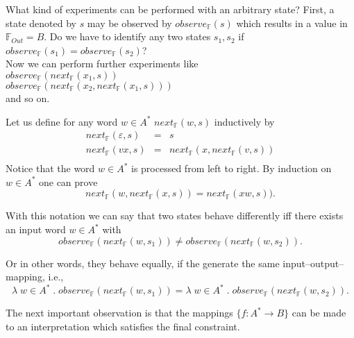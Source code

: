 \documentclass[landscape, autoslides, light]{mmiss}
\begin{document}
\begin{Package}[Label={FSDPT}, Title={Formal Specification of Data and Process Types}, ShortTitle={FSDPT}, Authors={Horst Reichel}, Date={February 2003}, LevelOfDetail=Lecture, Language=en-GB]
\begin{Section}[Title={Final Coalgebras as Process Types}, Label={section4}]
\begin{Section}[Title={Examples of Process Types}, Label={section4_2}]
\begin{Paragraph}[Title={final Moore--automaton}, Label=Paragraph96]
\end{Paragraph}
\begin{Paragraph}[Title={final Moore--automaton}, Label=Paragraph97]
\small What kind of experiments can be performed with an arbitrary
state?\pause \vspace{8mm}
 First, a state denoted by $s$ may be observed by
$observe_{\mathbb{F}}(s)$ which results in a value in
$\mathbb{F}_{Out} = B$. Do we have to identify any two states
$s_1, s_2$ if $observe_{\mathbb{F}}(s_1) =
observe_{\mathbb{F}}(s_2)$? \\ \pause \vspace{8mm}
Now we can perform further experiments like \\
\pause $observe_{\mathbb{F}}(next_{\mathbb{F}}(x_1,s))$ \\ \pause
$observe_{\mathbb{F}}(next_{\mathbb{F}}(x_2,next_{\mathbb{F}}(x_1,s)))$ \\
\pause and so on.

\end{Paragraph}
\begin{Paragraph}[Label=Paragraph98]

 Let us define for any word $w \in
A^*$ $next_{\mathbb{F}}(w,s)$ inductively by
$$\begin{array}{lll}
next_{\mathbb{F}}(\varepsilon,s) &  = & s \\
next_{\mathbb{F}}(vx,s) & = &
next_{\mathbb{F}}(x,next_{\mathbb{F}}(v,s))\\ \end{array}$$\pause
Notice that the word $w \in A^*$ is processed from left to right.
By induction on $w \in A^*$ one can prove
 $$next_{\mathbb{F}}(w, next_{\mathbb{F}}(x ,s)) =
  next_{\mathbb{F}}(xw ,s)).$$\pause

 With this notation we can say that two
states behave differently iff there exists an input word $w \in
A^*$ with $$ observe_{\mathbb{F}}(next_{\mathbb{F}}(w,s_1)) \not=
observe_{\mathbb{F}}(next_{\mathbb{F}}(w,s_2)).$$

\end{Paragraph}
\begin{Paragraph}[Label=Paragraph99]

Or in other words, they behave equally, if the generate the same
input--output--mapping, i.e., $$\lambda\;  w \in A^* \; . \;
observe_{\mathbb{F}}(next_{\mathbb{F}}(w,s_1)) = \lambda\;  w \in
A^* \; . \;
observe_{\mathbb{F}}(next_{\mathbb{F}}(w,s_2)).$$\pause

The next important observation is that the mappings $\{f : A^* \to
B \}$ can be made to an interpretation which satisfies the final
constraint. \pause


\end{Paragraph}
\end{Section}
\end{Section}
\end{Package}
\end{document}
